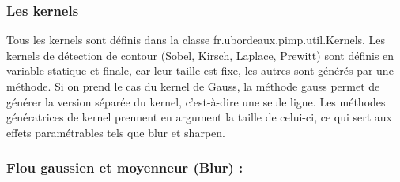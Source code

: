     \subsubsection*{Les kernels} \label{kernels}

        Tous les kernels sont définis dans la classe fr.ubordeaux.pimp.util.Kernels. Les kernels de détection de contour (Sobel, Kirsch, Laplace, Prewitt) sont définis
        en variable statique et finale, car leur taille est fixe, les autres sont générés par une méthode. Si on prend le cas du kernel de Gauss, la méthode gauss permet 
        de générer la version séparée du kernel, c'est-à-dire une seule ligne. Les méthodes génératrices de kernel prennent en argument la taille de celui-ci, ce qui sert
        aux effets paramétrables tels que blur et sharpen.

    \subsubsection{Flou gaussien et moyenneur (Blur) : } \label{blur}

